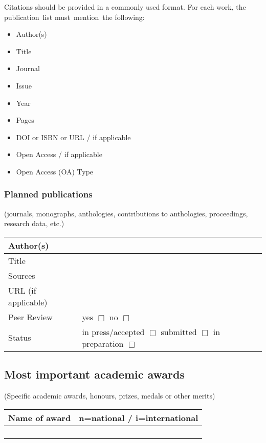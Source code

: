 \documentclass[a4paper, 11pt]{article}
\begin{document}
Citations should be provided in a commonly used format. For each work, the
publication list must mention the following:

\begin{itemize}
\item Author(s)
\item Title
\item Journal
\item Issue
\item Year
\item Pages
\item DOI or ISBN or URL / if applicable
\item Open Access / if applicable
\item Open Access (OA) Type
\end{itemize}

\subsubsection{Planned publications}

(journals, monographs, anthologies, contributions to anthologies, proceedings,
research data, etc.)

\begin{tabular}{|l|l|}
\hline
Author(s) & \\
\hline
Title & \\
\hline
Sources & \\
\hline
URL (if applicable) & \\
\hline
Peer Review & yes $\Box$ \hspace{3cm} no $\Box$ \\
\hline
Status & in press/accepted $\Box$ \hspace{1cm} submitted $\Box$ \hspace{1cm} in preparation $\Box$ \\
\hline
\end{tabular}

\subsection{Most important academic awards}
(Specific academic awards, honours, prizes, medals or other merits)

\begin{tabular}{|p{9cm}|c|}
\multicolumn{1}{c}{\textbf{Name of award}} & \multicolumn{1}{c}{\textbf{n=national / i=international}} \\
\hline
 & \\
\hline
 & \\
\hline
 & \\
\hline
 & \\
\hline
\end{tabular}
\end{document}
